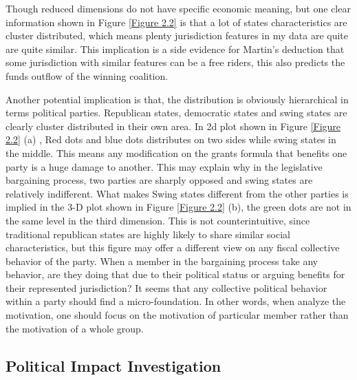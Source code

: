 Though reduced dimensions do not have specific economic meaning, but one clear information shown in Figure \ref*{Figure 2.2} is that a lot of states characteristics are cluster distributed, which means plenty jurisdiction features in my data are quite are quite similar. This implication is a side evidence for Martin's \cite{martin2018dividing} deduction that some jurisdiction with similar features can be a free riders, this also predicts the funds outflow of the winning coalition.

Another potential implication is that, the distribution is obviously hierarchical in terms political parties. Republican states, democratic states and swing states are clearly cluster distributed in their own area. In 2d plot shown in Figure \ref*{Figure 2.2} (a) , Red dots and blue dots distributes on two sides while swing states in the middle. This means any modification on the grants formula that benefits one party is a huge damage to another. This may explain why in the legislative bargaining process, two parties are sharply opposed and swing states are relatively indifferent. What makes Swing states different from the other parties is implied in the 3-D plot shown in Figure \ref*{Figure 2.2} (b), the green dots are not in the same level in the third dimension. This is not counterintuitive, since traditional republican states are highly likely to share similar social characteristics, but this figure may offer a different view on any fiscal collective behavior of the party. When a member in the bargaining process take any behavior, are they doing that due to their political status or arguing benefits for their represented jurisdiction? It seems that any collective political behavior within a party should find a micro-foundation. In other words, when analyze the motivation, one should focus on the motivation of particular member rather than the motivation of a whole group.

\subsection{Political Impact Investigation}


